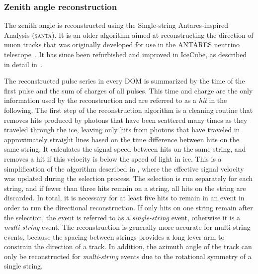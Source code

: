 \subsubsection{Zenith angle reconstruction}
\label{sec:santa}
The zenith angle is reconstructed using the Single-string Antares-inspired Analysis (\textsc{santa}).
It is an older algorithm aimed at reconstructing the direction of muon tracks that was originally developed for use in the ANTARES neutrino telescope~.
It has since been refurbished and improved in IceCube, as described in detail in~.

The reconstructed pulse series in every DOM is summarized by the time of the first pulse and the sum of charges of all pulses.
This time and charge are the only information used by the reconstruction and are referred to as a \emph{hit} in the following.
The first step of the reconstruction algorithm is a cleaning routine that removes hits produced
by photons that have been scattered many times as they traveled
through the ice, leaving only hits from photons that have traveled in approximately straight lines based on the time difference between hits on the same string.
It calculates the signal speed between hits on the same string, and removes a hit if this velocity is below the speed of light in ice.
This is a simplification of the algorithm described in \cite{Garza2014Measurement}, where the effective signal velocity was updated during the selection process.
The selection is run separately for each string, and if fewer than three hits remain on a string, all hits on the string are discarded.
In total, it is necessary for at least five hits to remain in an event in order to run the directional reconstruction.
If only hits on one string remain after the selection, the event is referred to as a \emph{single-string} event, otherwise it is a \emph{multi-string} event.
The reconstruction is generally more accurate for multi-string events, because the spacing between strings provides a long lever arm to constrain the direction of a track.
In addition, the azimuth angle of the track can only be reconstructed for \emph{multi-string} events due to the rotational symmetry of a single string.

